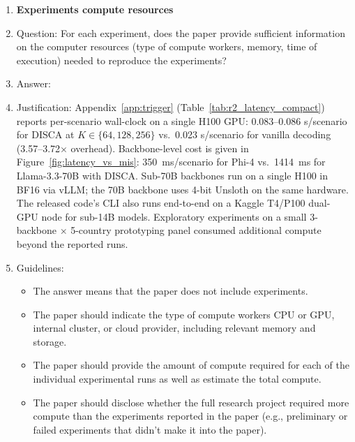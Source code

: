 \begin{enumerate}
\item {\bf Experiments compute resources}
    \item[] Question: For each experiment, does the paper provide sufficient information on the computer resources (type of compute workers, memory, time of execution) needed to reproduce the experiments?
    \item[] Answer: \answerYes{}
    \item[] Justification: Appendix~\ref{app:trigger} (Table~\ref{tab:r2_latency_compact}) reports per-scenario wall-clock on a single H100 GPU: 0.083--0.086 s/scenario for DISCA at $K\in\{64,128,256\}$ vs.\ 0.023 s/scenario for vanilla decoding (3.57--3.72$\times$ overhead). Backbone-level cost is given in Figure~\ref{fig:latency_vs_mis}: 350~ms/scenario for Phi-4 vs.\ 1414~ms for Llama-3.3-70B with DISCA. Sub-70B backbones run on a single H100 in BF16 via vLLM; the 70B backbone uses 4-bit Unsloth on the same hardware. The released code's CLI also runs end-to-end on a Kaggle T4/P100 dual-GPU node for sub-14B models. Exploratory experiments on a small 3-backbone $\times$ 5-country prototyping panel consumed additional compute beyond the reported runs.
    \item[] Guidelines:
    \begin{itemize}
        \item The answer \answerNA{} means that the paper does not include experiments.
        \item The paper should indicate the type of compute workers CPU or GPU, internal cluster, or cloud provider, including relevant memory and storage.
        \item The paper should provide the amount of compute required for each of the individual experimental runs as well as estimate the total compute. 
        \item The paper should disclose whether the full research project required more compute than the experiments reported in the paper (e.g., preliminary or failed experiments that didn't make it into the paper). 
    \end{itemize}
    

\end{enumerate}
